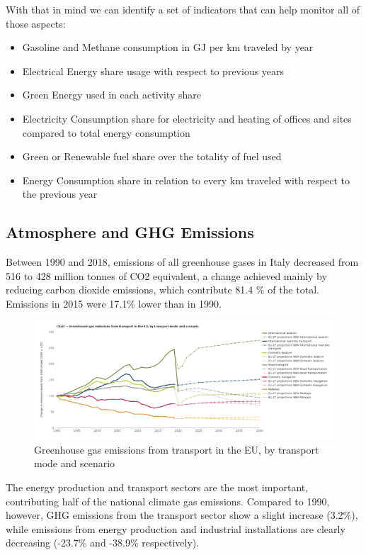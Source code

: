 With that in mind we can identify a set of indicators that can help monitor all of those aspects:
\begin{itemize}
    \item Gasoline and Methane consumption in GJ per km traveled by year
    \item Electrical Energy share usage with respect to previous years
    \item Green Energy used in each activity share
    \item Electricity Consumption share for electricity and heating of offices and sites compared to total energy consumption
    \item Green or Renewable fuel share over the totality of fuel used
    \item Energy Consumption share in relation to every km traveled with respect to the previous year
\end{itemize}

\subsection{Atmosphere and GHG Emissions}
\label{subsec:ghgemissions}
Between 1990 and 2018, emissions of all greenhouse gases in Italy decreased from 516 to 428 million tonnes of CO2 equivalent, a change achieved mainly by reducing carbon dioxide emissions, which contribute 81.4 \% of the total. Emissions in 2015 were 17.1\% lower than in 1990.

\begin{figure}[h!]
    \centering
    \includegraphics[width=1\textwidth]{Images/Green Sustainability/GHG emission.png}
    \caption{Greenhouse gas emissions from transport in the EU, by transport mode and scenario \cite{GreenhouseScenario}}
    \label{fig:ghgemissions}
\end{figure}

The energy production and transport sectors are the most important, contributing half of the national climate gas emissions. Compared to 1990, however, GHG emissions from the transport sector show a slight increase (3.2\%), while emissions from energy production and industrial installations are clearly decreasing (-23.7\% and -38.9\% respectively).

